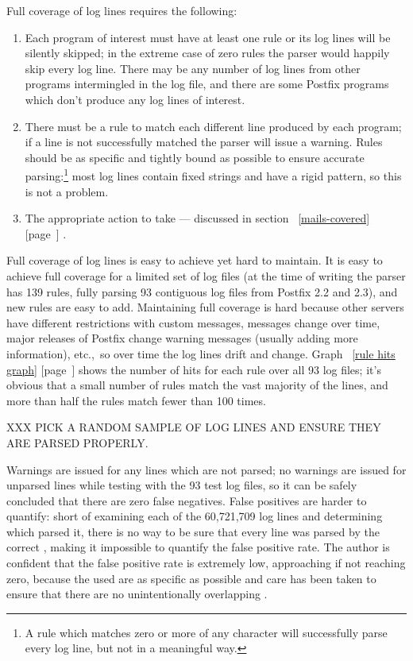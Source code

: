 \documentclass[a4paper,12pt,draft]{article}
\newcommand{\refwithpage}[1]{%
    \empty{}\ref{#1} [page~\pageref{#1}]%
}
\begin{document}
Full coverage of log lines requires the following:

\begin{enumerate}

    \item Each program of interest must have at least one rule or its log
        lines will be silently skipped; in the extreme case of zero rules
        the parser would happily skip every log line.  There may be any
        number of log lines from other programs intermingled in the log
        file, and there are some Postfix programs which don't produce any
        log lines of interest.

    \item There must be a rule to match each different line produced by
        each program; if a line is not successfully matched the parser will
        issue a warning.  Rules should be as specific and tightly bound as
        possible to ensure accurate parsing:\footnote{A rule which matches
        zero or more of any character will successfully parse every log
        line, but not in a meaningful way.} most log lines contain fixed
        strings and have a rigid pattern, so this is not a problem.

    \item The appropriate action to take --- discussed in
        section~\refwithpage{mails-covered}.

\end{enumerate}

Full coverage of log lines is easy to achieve yet hard to maintain.  It is
easy to achieve full coverage for a limited set of log files (at the time
of writing the parser has 139 rules, fully parsing 93 contiguous log files
from Postfix 2.2 and 2.3), and new rules are easy to add.  Maintaining full
coverage is hard because other servers have different restrictions with
custom messages, \RBL{} messages change over time, major releases of
Postfix change warning messages (usually adding more information), etc.,\
so over time the log lines drift and change.  Graph~\refwithpage{rule hits
graph} shows the number of hits for each rule over all 93 log files; it's
obvious that a small number of rules match the vast majority of the lines,
and more than half the rules match fewer than 100 times.

XXX PICK A RANDOM SAMPLE OF LOG LINES AND ENSURE THEY ARE PARSED
PROPERLY\@.

Warnings are issued for any lines which are not parsed; no warnings are
issued for unparsed lines while testing with the 93 test log files, so it
can be safely concluded that there are zero false negatives.  False
positives are harder to quantify: short of examining each of the 60,721,709
log lines and determining which \regex{} parsed it, there is no way to be
sure that every line was parsed by the correct \regex{}, making it
impossible to quantify the false positive rate.  The author is confident
that the false positive rate is extremely low, approaching if not reaching
zero, because the \regexes{} used are as specific as possible and care has
been taken to ensure that there are no unintentionally overlapping
\regexes{}.
\end{document}
